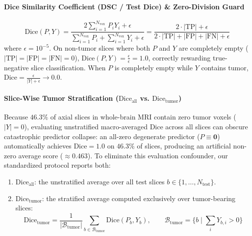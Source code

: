 \documentclass{article}
\begin{document}
\paragraph{Dice Similarity Coefficient (DSC / Test Dice) \& Zero-Division Guard}
\begin{equation}
    \text{Dice}(P, Y) = \frac{2 \sum_{i=1}^{N_{\text{vox}}} P_i Y_i + \epsilon}{\sum_{i=1}^{N_{\text{vox}}} P_i + \sum_{i=1}^{N_{\text{vox}}} Y_i + \epsilon} = \frac{2 \cdot |\text{TP}| + \epsilon}{2 \cdot |\text{TP}| + |\text{FP}| + |\text{FN}| + \epsilon}
\end{equation}
where $\epsilon = 10^{-5}$. On non-tumor slices where both $P$ and $Y$ are completely empty ($|\text{TP}| = |\text{FP}| = |\text{FN}| = 0$), $\text{Dice}(P, Y) = \frac{\epsilon}{\epsilon} = 1.0$, correctly rewarding true-negative slice classification. When $P$ is completely empty while $Y$ contains tumor, $\text{Dice} = \frac{\epsilon}{|Y| + \epsilon} \to 0.0$.

\paragraph{Slice-Wise Tumor Stratification ($\text{Dice}_{\text{all}}$ vs. $\text{Dice}_{\text{tumor}}$)}
Because $46.3\%$ of axial slices in whole-brain MRI contain zero tumor voxels ($|Y| = 0$), evaluating unstratified macro-averaged Dice across all slices can obscure catastrophic predictor collapse: an all-zero degenerate predictor ($P \equiv \mathbf{0}$) automatically achieves $\text{Dice} = 1.0$ on $46.3\%$ of slices, producing an artificial non-zero average score ($\approx 0.463$). To eliminate this evaluation confounder, our standardized protocol reports both:
\begin{enumerate}
    \item $\text{Dice}_{\text{all}}$: the unstratified average over all test slices $b \in \{1, \dots, N_{\text{test}}\}$.
    \item $\text{Dice}_{\text{tumor}}$: the stratified average computed exclusively over tumor-bearing slices:
    \begin{equation}
        \text{Dice}_{\text{tumor}} = \frac{1}{|\mathcal{B}_{\text{tumor}}|} \sum_{b \in \mathcal{B}_{\text{tumor}}} \text{Dice}(P_b, Y_b), \qquad \mathcal{B}_{\text{tumor}} = \{b \mid \sum_{i} Y_{b, i} > 0\}
    \end{equation}
\end{enumerate}
\end{document}
